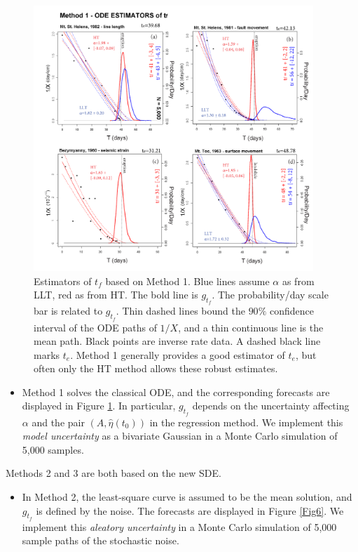 \documentclass{article}
\begin{document}
\begin{figure}[H]
\centering
\includegraphics[width=0.94\textwidth]{Fig5_plusX.png}
\caption{Estimators of $t_f$ based on Method 1. Blue lines assume $\alpha$ as from LLT, red as from HT. The bold line is $g_{t_f}$. The probability/day scale bar is related to $g_{t_f}$. Thin dashed lines bound the $90\%$ confidence interval of the ODE paths of $1/X$, and a thin continuous line is the mean path. Black points are inverse rate data. A dashed black line marks $t_e$. Method 1 generally provides a good estimator of $t_e$, but often only the HT method allows these robust estimates.}
\label{Fig5}
\end{figure}

\begin{itemize}
\item Method 1 solves the classical ODE, and the corresponding forecasts are displayed in Figure \ref{Fig5}. In particular, $g_{t_f}$ depends on the uncertainty affecting $\alpha$ and the pair $(A, \hat\eta(t_0))$ in the regression method. We implement this \emph{model uncertainty} as a bivariate Gaussian in a Monte Carlo simulation of 5,000 samples.
\end{itemize}

Methods 2 and 3 are both based on the new SDE.
\begin{itemize}
\item In Method 2, the least-square curve is assumed to be the mean solution, and $g_{t_f}$ is defined by the noise. The forecasts are displayed in Figure \ref{Fig6}. We implement this \emph{aleatory uncertainty} in a Monte Carlo simulation of 5,000 sample paths of the stochastic noise.
\end{itemize}
\end{document}
